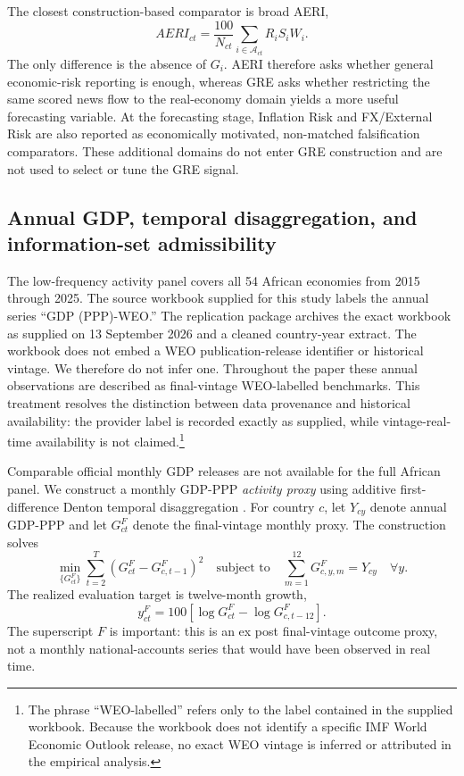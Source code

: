 \documentclass[preprint,12pt,authoryear]{elsarticle}
\begin{document}
The closest construction-based comparator is broad AERI,
\begin{equation}
AERI_{ct}=\frac{100}{N_{ct}}\sum_{i\in\mathcal A_{ct}}R_iS_iW_i.
\label{eq:aeri_comp}
\end{equation}
The only difference is the absence of $G_i$. AERI therefore asks whether general economic-risk reporting is enough, whereas GRE asks whether restricting the same scored news flow to the real-economy domain yields a more useful forecasting variable. At the forecasting stage, Inflation Risk and FX/External Risk are also reported as economically motivated, non-matched falsification comparators. These additional domains do not enter GRE construction and are not used to select or tune the GRE signal.

\subsection{Annual GDP, temporal disaggregation, and information-set admissibility}
The low-frequency activity panel covers all 54 African economies from 2015 through 2025. The source workbook supplied for this study labels the annual series ``GDP (PPP)-WEO.'' The replication package archives the exact workbook as supplied on 13 September 2026 and a cleaned country-year extract. The workbook does not embed a WEO publication-release identifier or historical vintage. We therefore do not infer one. Throughout the paper these annual observations are described as final-vintage WEO-labelled benchmarks. This treatment resolves the distinction between data provenance and historical availability: the provider label is recorded exactly as supplied, while vintage-real-time availability is not claimed.\footnote{The phrase ``WEO-labelled'' refers only to the label contained in the supplied workbook. Because the workbook does not identify a specific IMF World Economic Outlook release, no exact WEO vintage is inferred or attributed in the empirical analysis.}

Comparable official monthly GDP releases are not available for the full African panel. We construct a monthly GDP-PPP \emph{activity proxy} using additive first-difference Denton temporal disaggregation \citep{denton1971,imfqna2017}. For country $c$, let $Y_{cy}$ denote annual GDP-PPP and let $G^{F}_{ct}$ denote the final-vintage monthly proxy. The construction solves
\begin{equation}
\min_{\{G^{F}_{ct}\}}\sum_{t=2}^{T}(G^{F}_{ct}-G^{F}_{c,t-1})^2
\quad\text{subject to}\quad
\sum_{m=1}^{12}G^{F}_{c,y,m}=Y_{cy}\quad\forall y.
\label{eq:denton}
\end{equation}
The realized evaluation target is twelve-month growth,
\begin{equation}
y^{F}_{ct}=100[\log G^{F}_{ct}-\log G^{F}_{c,t-12}].
\label{eq:gdp12}
\end{equation}
The superscript $F$ is important: this is an ex post final-vintage outcome proxy, not a monthly national-accounts series that would have been observed in real time.
\end{document}
